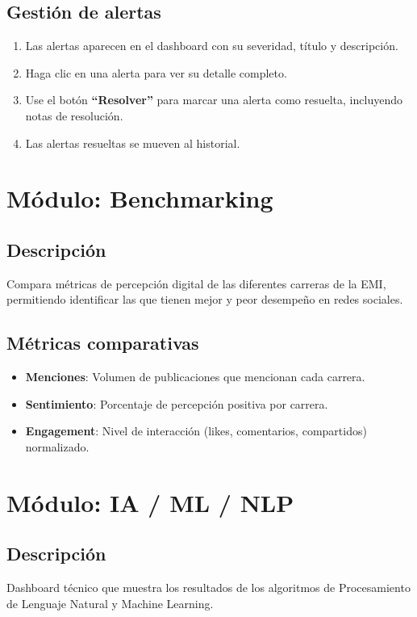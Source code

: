 \documentclass[12pt,a4paper]{article}
\begin{document}
\subsection{Gestión de alertas}
\begin{enumerate}
  \item Las alertas aparecen en el dashboard con su severidad, título y descripción.
  \item Haga clic en una alerta para ver su detalle completo.
  \item Use el botón \textbf{``Resolver''} para marcar una alerta como resuelta, incluyendo notas de resolución.
  \item Las alertas resueltas se mueven al historial.
\end{enumerate}

\section{Módulo: Benchmarking}

\subsection{Descripción}
Compara métricas de percepción digital de las diferentes carreras de la EMI, permitiendo identificar las que tienen mejor y peor desempeño en redes sociales.

\subsection{Métricas comparativas}
\begin{itemize}
  \item \textbf{Menciones}: Volumen de publicaciones que mencionan cada carrera.
  \item \textbf{Sentimiento}: Porcentaje de percepción positiva por carrera.
  \item \textbf{Engagement}: Nivel de interacción (likes, comentarios, compartidos) normalizado.
\end{itemize}

\section{Módulo: IA / ML / NLP}

\subsection{Descripción}
Dashboard técnico que muestra los resultados de los algoritmos de Procesamiento de Lenguaje Natural y Machine Learning.
\end{document}
